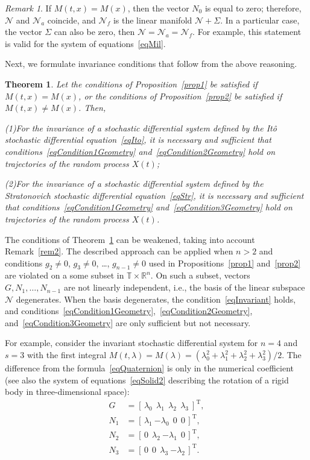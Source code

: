 \documentclass[10pt,reqno]{amsart}
\newcommand{\trans}{{\scriptscriptstyle \mathrm{T}}}
\theoremstyle{plain}
\newtheorem{Theorem}{Theorem}
\theoremstyle{remark}
\newtheorem{Remark}{Remark}
\begin{document}
\begin{Remark}\label{rem4}
If $M(t,x) = M(x)$, then the vector $N_0$ is equal to zero; therefore, $\mathcal{N}$ and $\mathcal{N}_a$ coincide, and $\mathcal{N}_f$ is the linear manifold $\mathcal{N} + \Sigma$. In a particular case, the vector $\Sigma$ can also be zero, then $\mathcal{N} = \mathcal{N}_a = \mathcal{N}_f$. For example, this statement is valid for the system of equations~\eqref{eqMil}.
\end{Remark}

Next, we formulate invariance conditions that follow from the above reasoning.

\begin{Theorem}\label{thm1}
Let the conditions of Proposition~\ref{prop1} be satisfied if $M(t,x) = M(x)$, or the conditions of Proposition~\ref{prop2} be satisfied if $M(t,x) \neq M(x)$. Then,

{\rm (1)}\;For the invariance of a stochastic differential system defined by the It\^o stochastic differential equation~\eqref{eqIto}, it is necessary and sufficient that conditions~\eqref{eqCondition1Geometry} and~\eqref{eqCondition2Geometry} hold on trajectories of the random process $X(t)$;

{\rm (2)}\;For the invariance of a stochastic differential system defined by the Stratonovich stochastic differential equation~\eqref{eqStr}, it is necessary and sufficient that conditions~\eqref{eqCondition1Geometry} and~\eqref{eqCondition3Geometry} hold on trajectories of the random process $X(t)$.
\end{Theorem}

The conditions of Theorem~\ref{thm1} can be weakened, taking into account Remark~\ref{rem2}. The described approach can be applied when $n > 2$ and conditions $g_2 \neq 0$, $g_3 \neq 0$, \dots, $g_{n-1} \neq 0$ used in Propositions~\ref{prop1} and~\ref{prop2} are violated on a some subset in $\mathds{T} \times \mathds{R}^n$. On such a subset, vectors $G,N_1,\dots,N_{n-1}$ are not linearly independent, i.e., the basis of the linear subspace $\mathcal{N}$ degenerates. When the basis degenerates, the condition~\eqref{eqInvariant} holds, and conditions~\eqref{eqCondition1Geometry},~\eqref{eqCondition2Geometry}, and~\eqref{eqCondition3Geometry} are only sufficient but not necessary.

For example, consider the invariant stochastic differential system for $n = 4$ and $s = 3$ with the first integral $M(t,\lambda) = M(\lambda) = (\lambda_0^2 + \lambda_1^2 + \lambda_2^2 + \lambda_3^2)/2$. The difference from the formula~\eqref{eqQuaternion} is only in the numerical coefficient (see also the system of equations~\eqref{eqSolid2} describing the rotation of a rigid body in three-dimensional space):
\begin{align*}
  G & = [ \, \lambda_0 \;\, \lambda_1 \;\, \lambda_2 \;\, \lambda_3 \: ]^\trans, \\
  N_1 & = [ \, \lambda_1 ~ {-\lambda_0} \ \ 0 \ \ 0 \, ]^\trans, \\
  N_2 & = [ \, 0 \ \ \lambda_2 ~ {-\lambda_1} \ \ 0 \, ]^\trans, \\
  N_3 & = [ \, 0 \ \ 0 \ \ \lambda_3 ~ {-\lambda_2} \, ]^\trans.
\end{align*}
\end{document}
